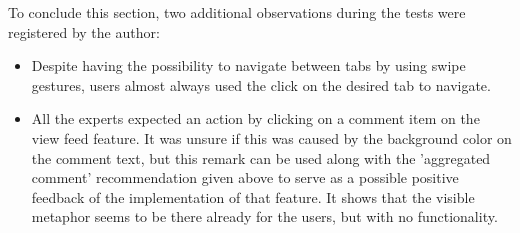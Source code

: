 To conclude this section, two additional observations during the tests were registered by the author:

\begin{itemize}
\item Despite having the possibility to navigate between tabs by using swipe gestures, users almost always used the click on the desired tab to navigate.
\item All the experts expected an action by clicking on a comment item on the view feed feature. It was unsure if this was caused by the background color on the comment text, but this remark can be used along with the 'aggregated comment' recommendation given above to serve as a possible positive feedback of the implementation of that feature. It shows that the visible metaphor seems to be there already for the users, but with no functionality.
\end{itemize}